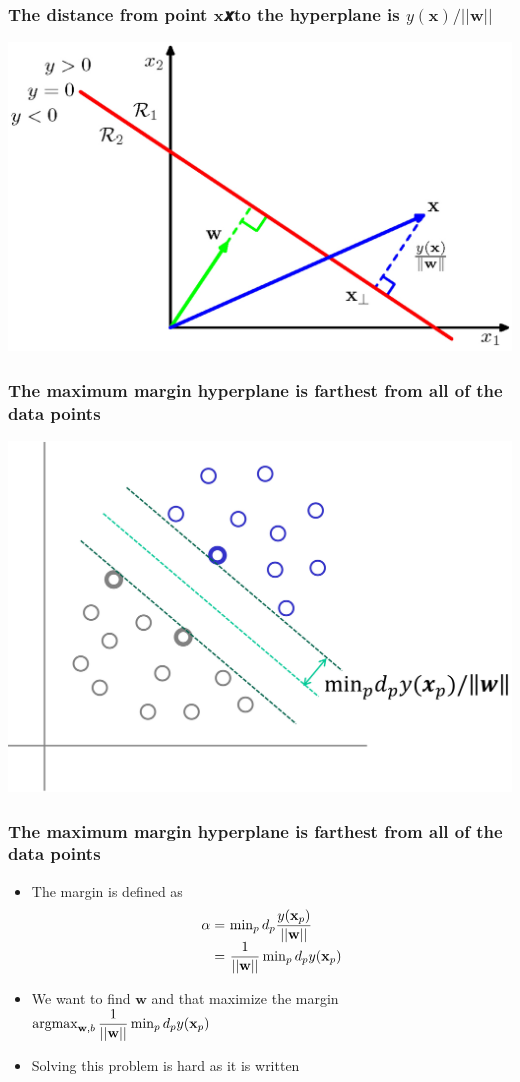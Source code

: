 \documentclass[12pt,notes,mathserif]{beamer}
\begin{document}
\begin{frame}[c]
	\frametitle{The distance from point $\mathbf{x}$𝒙to the hyperplane is $y(\mathbf{x})/||\mathbf{w}||$}
	\begin{center}
		\includegraphics[width=0.7\linewidth]{fig8/lec818.jpg}
	\end{center}
\end{frame}


\begin{frame}[c]
	\frametitle{The maximum margin hyperplane is farthest from all of the data points}
	\begin{center}
		\includegraphics[width=0.7\linewidth]{fig8/lec819.jpg}
	\end{center}
\end{frame}


\begin{frame}[c]
	\frametitle{The maximum margin hyperplane is farthest from all of the data points}
	\begin{itemize}
		\item The margin is defined as
		      \[
			      \begin{array}{r@{~}l}
				      \alpha= & \min_pd_p\dfrac{y(\mathbf{x}_p)}{||\mathbf{w}||}  \\
				      =       & \dfrac{1}{||\mathbf{w}||}\min_pd_py(\mathbf{x}_p)
			      \end{array}
		      \]
		\item We want to find $\mathbf{w}$ and  that maximize the margin $\mathop{\mathrm{argmax}}_{\mathbf{w},b}\dfrac{1}{||\mathbf{w}||} \min_pd_py(\mathbf{x}_p)$
		\item Solving this problem is hard as it is written
	\end{itemize}
\end{frame}
\end{document}
